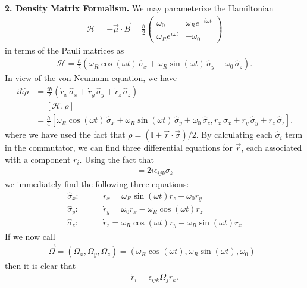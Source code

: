 \documentclass{article}
\theoremstyle{definition}
\newcommand{\ham}{\mathcal{H}}
\newcommand{\f}[2]{\frac{#1}{#2}}
\newcommand{\lp}{\left(}
\newcommand{\rp}{\right)}
\begin{document}
	

\noindent \textbf{2. Density Matrix Formalism.} We may parameterize the Hamiltonian
\begin{align*}
\ham = -\vec{\mu} \cdot \vec{B} = \f{\hbar}{2}\begin{pmatrix}
\omega_0 & \omega_R e^{-i\omega t} \\ \omega_R e^{i\omega t} & -\omega_0
\end{pmatrix}
\end{align*}
in terms of the Pauli matrices as 
\begin{align*}
\ham = \f{\hbar}{2}\lp 
\omega_R \cos(\omega t) \, \hat \sigma_x + 
\omega_R \sin(\omega t) \, \hat \sigma_y + 
\omega_0 \, \hat\sigma_z \rp.
\end{align*}
In view of the von Neumann equation, we have
\begin{align*}
i\hbar \dot \rho &= \f{i\hbar}{2} (\dot r_x \,\hat\sigma_x + \dot r_y \,\hat\sigma_y + \dot r_z \,\hat\sigma_z ) \\
&= [\ham, \rho] \\
&= \f{\hbar}{4}[\omega_R \cos(\omega t) \, \hat \sigma_x + 
\omega_R \sin(\omega t) \, \hat \sigma_y + 
\omega_0 \, \hat\sigma_z , r_x\,\hat\sigma_x + r_y \, \hat \sigma_y + r_z \, \hat \sigma_z].
\end{align*}
where we have used the fact that $\rho = (\mathbb{I} + \vec{r}\cdot \vec{\sigma})/2$. By calculating each $\hat \sigma_i$ term in the commutator, we can find three differential equations for $\vec{r}$, each associated with a component $r_i$. Using the fact that
\begin{align*}
[\sigma_i, \sigma_j] = 2i \epsilon_{ijk} \sigma_k
\end{align*}
we immediately find the following three equations:
\begin{align*}
\hat \sigma_x : &\quad\quad \dot r_x = \omega_R \sin(\omega t) r_z - \omega_0 r_y \\
\hat \sigma_y : &\quad\quad \dot r_y = \omega_0 r_x - \omega_R \cos(\omega t) r_z \\
\hat \sigma_z : &\quad\quad \dot r_z = \omega_R \cos(\omega t) r_y - \omega_R \sin(\omega t) r_x
\end{align*}
If we now call
\begin{align*}
\vec{\Omega} = (\Omega_x, \Omega_y, \Omega_z)  =(\omega_R \cos(\omega t), \omega_R \sin(\omega t), \omega_0)^\top
\end{align*}
then it is clear that
\begin{align*}
\dot r_i = \epsilon_{ijk} \Omega_j r_k.
\end{align*}
\end{document}
